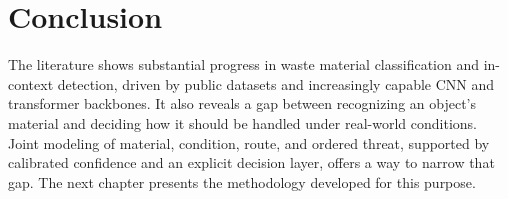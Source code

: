 \section{Conclusion}
The literature shows substantial progress in waste material classification and in-context detection, driven by public datasets and increasingly capable CNN and transformer backbones. It also reveals a gap between recognizing an object's material and deciding how it should be handled under real-world conditions. Joint modeling of material, condition, route, and ordered threat, supported by calibrated confidence and an explicit decision layer, offers a way to narrow that gap. The next chapter presents the methodology developed for this purpose.
